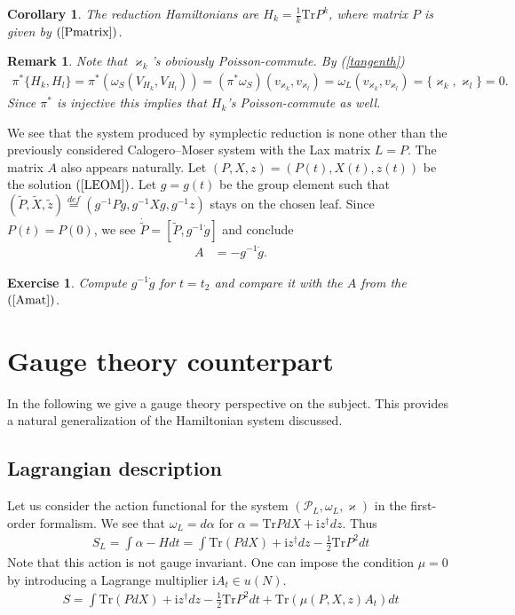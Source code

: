 \documentclass[12pt]{article}
\newtheorem{exer}{Exercise}[section]
\newtheorem{rem}{Remark}[section]
\newtheorem{cor}{Corollary}[section]
\numberwithin{equation}{section}
\theoremstyle{definition}
\newcommand {\ii} {\mathrm{i}}
\begin{document}
\begin{cor}
   The reduction Hamiltonians are $H_{k} = \frac{1}{k}\mathrm{Tr} P^{k}$, where matrix $P$ is given by $(\ref{Pmatrix})$.
\end{cor}
\begin{rem}\normalfont
    Note that $\varkappa_{k}$'s obviously Poisson-commute. By (\ref{tangenth}) 
\begin{align*}
    \pi^{*}\{H_{k}, H_{l}\} = \pi^{*}(\omega_{S}(V_{H_{k}}, V_{H_{l}})) = (\pi^{*}\omega_{S})(v_{\varkappa_{k}}, v_{\varkappa_{l}})=
    \omega_{L}(v_{\varkappa_{k}}, v_{\varkappa_{l}}) = \{\varkappa_{k},\varkappa_{l}\}=0.
\end{align*}    
Since $\pi^{*}$ is injective this implies that $H_{k}$'s Poisson-commute as well.
\end{rem}
We see that the system produced by symplectic reduction is none other than the previously considered Calogero--Moser system with the Lax matrix $L = P$. The matrix $A$ also appears naturally. Let $(P, X, z) = (P(t), X(t), z(t))$ be the solution $(\ref{LEOM})$. Let $g = g(t)$ be the group element such that $(\tilde{P}, \tilde{X}, \tilde{z}) \overset{def}{=} (g^{-1} P g, g^{-1} X g, g^{-1}z)$ stays on the chosen leaf. Since $P(t) = P(0)$, we see $\dot{\tilde{P}} = [\tilde{P}, g^{-1} \dot g]$ and conclude
\begin{align*}
      A &= -g^{-1} \dot g.
\end{align*}
\begin{exer}
    Compute $g^{-1} \dot g$ for $t = t_{2}$ and compare it with the $A$ from the $(\ref{Amat})$.
\end{exer}
\section{Gauge theory counterpart}
In the following we give a gauge theory perspective on the subject. This provides a natural generalization of the Hamiltonian system discussed.  
\subsection{Lagrangian description}
Let us consider the action functional for the system $(\mathcal{P}_{L}, \omega_{L}, \varkappa)$ in the first-order formalism. We see that $\omega_{L} = d \alpha$ for $\alpha = \mathrm{Tr} P d X + {\ii} z^{\dagger} dz$. Thus
\begin{align*}
    S_{L} = \int \alpha - H dt = \int \mathrm{Tr} (P d X) + {\ii} z^{\dagger} d z - \frac{1}{2} \mathrm{Tr} P^2 dt
\end{align*}
Note that this action is not gauge invariant. One can impose the condition $\mu = 0$ by introducing a Lagrange multiplier ${\ii}A_{t} \in u(N)$.
\begin{align}
    S = \int \mathrm{Tr} (P d X) + {\ii} z^{\dagger} d z - \frac{1}{2} \mathrm{Tr} P^2 dt + \mathrm{Tr} (\mu (P, X, z) A_{t}) dt
\end{align}
\end{document}
